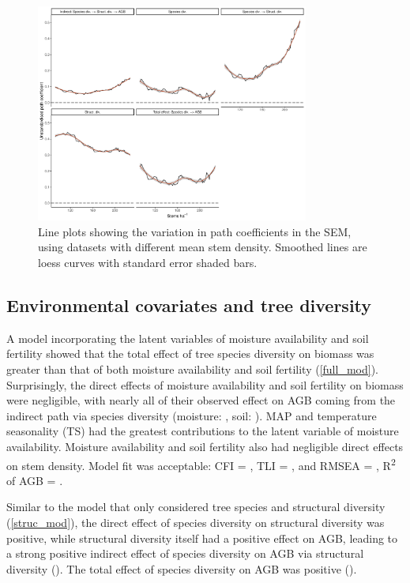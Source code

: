 \documentclass[11pt,a4paper]{article}
\begin{document}
\begin{figure}[H]
\centering
	\includegraphics[width=0.8\textwidth]{sem_struc_stems_ha}
	\caption{Line plots showing the variation in path coefficients in the SEM, using datasets with different mean stem density. Smoothed lines are loess curves with standard error shaded bars.}
	\label{sem_struc_stems_ha}
\end{figure}

\subsection{Environmental covariates and tree diversity}

A model incorporating the latent variables of moisture availability and soil fertility showed that the total effect of tree species diversity on biomass was greater than that of both moisture availability and soil fertility (\autoref{full_mod}). Surprisingly, the direct effects of moisture availability and soil fertility on biomass were negligible, with nearly all of their observed effect on AGB coming from the indirect path via species diversity (moisture: \rgmbd{}, soil: \rgsbd{}). MAP and temperature seasonality (TS) had the greatest contributions to the latent variable of moisture availability. Moisture availability and soil fertility also had negligible direct effects on stem density.  Model fit was acceptable: CFI = \fmcfi{}, TLI = \fmtli{}, and RMSEA = \fmrmsea{}, R\textsuperscript{2} of AGB = \fmrsq{}.

Similar to the model that only considered tree species and structural diversity (\autoref{struc_mod}), the direct effect of species diversity on structural diversity was positive, while structural diversity itself had a positive effect on AGB, leading to a strong positive indirect effect of species diversity on AGB via structural diversity (\rgbhd{}). The total effect of species diversity on AGB was positive (\rgbd{}).
\end{document}
